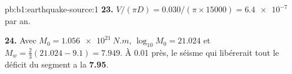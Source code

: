 \begin{solution}{pb:b1:earthquake-source:1}
\textbf{23.} $V/(\pi D) = \num{0.030}/(\pi\times\num{15000}) = \num{6.4e-7}$
par an.

\textbf{24.} Avec $M_0 = \qty{1.056e21}{N.m}$, $\log_{10}M_0 = 21.024$ et
$M_w = \tfrac23(21.024 - 9.1) = 7.949$. À 0.01 près, le séisme qui libérerait
tout le déficit du segment a la 
\textbf{7.95}.
\end{solution}
